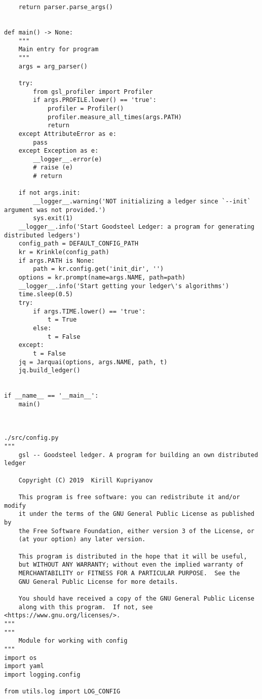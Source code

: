 \begin{lstlisting}
    return parser.parse_args()


def main() -> None:
    """
    Main entry for program
    """
    args = arg_parser()

    try:
        from gsl_profiler import Profiler
        if args.PROFILE.lower() == 'true':
            profiler = Profiler()
            profiler.measure_all_times(args.PATH)
            return
    except AttributeError as e:
        pass
    except Exception as e:
        __logger__.error(e)
        # raise (e)
        # return

    if not args.init:
        __logger__.warning('NOT initializing a ledger since `--init` argument was not provided.')
        sys.exit(1)
    __logger__.info('Start Goodsteel Ledger: a program for generating distributed ledgers')
    config_path = DEFAULT_CONFIG_PATH
    kr = Krinkle(config_path)
    if args.PATH is None:
        path = kr.config.get('init_dir', '')
    options = kr.prompt(name=args.NAME, path=path)
    __logger__.info('Start getting your ledger\'s algorithms')
    time.sleep(0.5)
    try:
        if args.TIME.lower() == 'true':
            t = True
        else:
            t = False
    except:
        t = False
    jq = Jarquai(options, args.NAME, path, t)
    jq.build_ledger()


if __name__ == '__main__':
    main()



./src/config.py
"""
    gsl -- Goodsteel ledger. A program for building an own distributed ledger

    Copyright (C) 2019  Kirill Kupriyanov

    This program is free software: you can redistribute it and/or modify
    it under the terms of the GNU General Public License as published by
    the Free Software Foundation, either version 3 of the License, or
    (at your option) any later version.

    This program is distributed in the hope that it will be useful,
    but WITHOUT ANY WARRANTY; without even the implied warranty of
    MERCHANTABILITY or FITNESS FOR A PARTICULAR PURPOSE.  See the
    GNU General Public License for more details.

    You should have received a copy of the GNU General Public License
    along with this program.  If not, see <https://www.gnu.org/licenses/>.
"""
"""
    Module for working with config
"""
import os
import yaml
import logging.config

from utils.log import LOG_CONFIG


\end{lstlisting}
